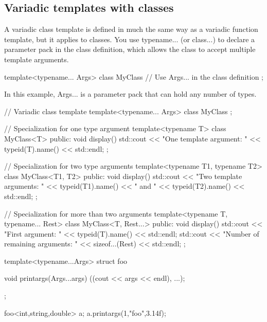 \documentclass{report}
\begin{document}
     \subsection{Variadic templates with classes}
     \bigbreak \noindent 
     A variadic class template is defined in much the same way as a variadic function template, but it applies to classes. You use typename... (or class...) to declare a parameter pack in the class definition, which allows the class to accept multiple template arguments.
     \bigbreak \noindent 
     \begin{cppcode}
         template<typename... Args>
         class MyClass {
             // Use Args... in the class definition
         };
     \end{cppcode}
     \bigbreak \noindent 
     In this example, Args... is a parameter pack that can hold any number of types.
     \bigbreak \noindent 
     \begin{cppcode}
         // Variadic class template
         template<typename... Args>
         class MyClass {};

         // Specialization for one type argument
         template<typename T>
         class MyClass<T> {
             public:
             void display() {
                 std::cout << "One template argument: " << typeid(T).name() << std::endl;
             }
         };

         // Specialization for two type arguments
         template<typename T1, typename T2>
         class MyClass<T1, T2> {
             public:
             void display() {
                 std::cout << "Two template arguments: "
                 << typeid(T1).name() << " and " << typeid(T2).name() << std::endl;
             }
         };

         // Specialization for more than two arguments
         template<typename T, typename... Rest>
         class MyClass<T, Rest...> {
             public:
             void display() {
                 std::cout << "First argument: " << typeid(T).name() << std::endl;
                 std::cout << "Number of remaining arguments: " << sizeof...(Rest) << std::endl;
             }
         };
     \end{cppcode}
     \bigbreak \noindent 
     \begin{cppcode}
         template<typename...Args>
         struct foo {

             void printargs(Args...args) {
                 ((cout << args << endl), ...);
             }
         };

         foo<int,string,double> a;
         a.printargs(1,"foo",3.14f);
     \end{cppcode}
\end{document}
